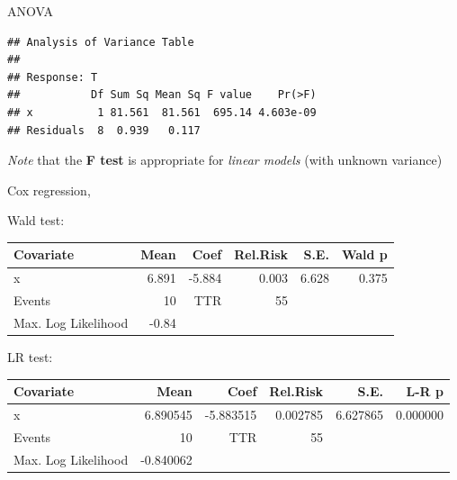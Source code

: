 \begin{frame}[fragile]{ANOVA}

\begin{Shaded}
\begin{Highlighting}[]
\end{Highlighting}
\end{Shaded}

\begin{verbatim}
## Analysis of Variance Table
## 
## Response: T
##           Df Sum Sq Mean Sq F value    Pr(>F)
## x          1 81.561  81.561  695.14 4.603e-09
## Residuals  8  0.939   0.117
\end{verbatim}

\emph{Note} that the \textbf{F test} is appropriate for \emph{linear
models} (with unknown variance)

\end{frame}

\begin{frame}{Cox regression,}

Wald test:

\begin{table}[ht] 
\begin{center} 
\begin{tabular}{lrrrrr} 
\hline 
Covariate & Mean & Coef & Rel.Risk & S.E. &   Wald p \\ \hline
x  &     6.891  &  -5.884  &  0.003  &  6.628  & 0.375 \\ 
\hline 
Events &  10  & TTR &  55 \\ 
Max. Log Likelihood &  -0.84 \\ \hline 
\hline 
\end{tabular}
\end{center} 
\end{table}

LR test:

\scriptsize

\begin{table}[ht] 
\begin{center} 
\begin{tabular}{lrrrrr} 
\hline 
Covariate & Mean & Coef & Rel.Risk & S.E. &   L-R p \\ \hline
x  &  6.890545  &  -5.883515  &  0.002785  &  6.627865  & 0.000000 \\ 
\hline 
Events &  10  & TTR &  55 \\ 
Max. Log Likelihood &  -0.840062 \\ \hline 
\hline 
\end{tabular}
\end{center} 
\end{table}

\end{frame}

